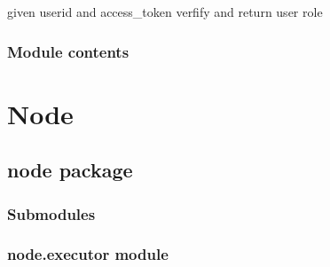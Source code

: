 \documentclass[letterpaper,10pt,english]{sphinxmanual}
\begin{document}
\begin{fulllineitems}
\begin{fulllineitems}
\label{\detokenize{orchestrator:orchestrator.orchestrator.LeotestOrchestratorGrpc.verify_user}}
\pysigstartsignatures
{}
\pysigstopsignatures
\sphinxAtStartPar
given userid and access\_token verfify and return user role

\end{fulllineitems}


\end{fulllineitems}



\subsection{Module contents}
\label{\detokenize{orchestrator:module-orchestrator}}\label{\detokenize{orchestrator:module-contents}}

\chapter{Node}
\label{\detokenize{modules:node}}
\sphinxstepscope


\section{node package}
\label{\detokenize{node:node-package}}\label{\detokenize{node::doc}}

\subsection{Submodules}
\label{\detokenize{node:submodules}}

\subsection{node.executor module}
\label{\detokenize{node:module-node.executor}}\label{\detokenize{node:node-executor-module}}
\end{document}
